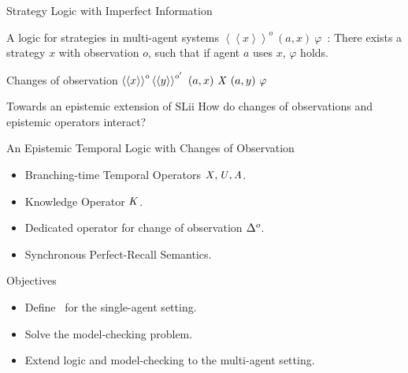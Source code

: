 \begin{frame}{Strategy Logic with Imperfect Information}

  \begin{block}{A logic for strategies in multi-agent systems}
    $\left<\left< x\right>\right>^o~(a,x)~\varphi$~:\quad
    There exists a strategy $x$ with observation $o$, such that if agent $a$ uses $x$, $\varphi$ holds.
  \end{block}
  \vfill
  \begin{alertblock}{Changes of observation}
    $\left<\left< x\right>\right>^o\left<\left< y \right>\right>^{o'}~(a,x)~\mathit{X}~(a,y)~\varphi$
  \end{alertblock}
  \vfill
  \begin{exampleblock}{Towards an epistemic extension of SLii}
    How do changes of observations and epistemic operators interact?
  \end{exampleblock}
    
\end{frame}


\begin{frame}{\ctlskd}

  \begin{block}{An Epistemic Temporal Logic with Changes of Observation}
    \begin{itemize}
    \item Branching-time Temporal Operators $\mathit{X},\mathit{U},\mathit{A}$.
    \item Knowledge Operator $\mathit{K}$.
    \item Dedicated operator for change of observation $\Delta^{o}$.
    \item Synchronous Perfect-Recall Semantics.
    \end{itemize}
  \end{block}
  \vfill
  \begin{exampleblock}{Objectives}
    \begin{itemize}
    \item Define \ctlskd\ for the single-agent setting.
    \item Solve the model-checking problem.
    \item Extend logic and model-checking to the multi-agent setting.
    \end{itemize}
  \end{exampleblock}
  
\end{frame}

